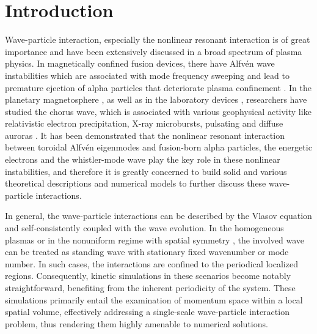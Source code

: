 \section{Introduction}
Wave-particle interaction, especially the nonlinear resonant interaction is of great importance and have been extensively discussed in a broad spectrum of plasma physics. 
In magnetically confined fusion devices, there have Alfv\'en wave instabilities \cite{chen2016,wang2018,} which are associated with mode frequency sweeping and lead to premature ejection of alpha particles that deteriorate plasma confinement \cite{fasoli2007}.
In the planetary magnetosphere \cite{tsurutani1974}, as well as in the laboratory devices \cite{vancompernolle2015,vancompernolle2017a}, researchers have studied the chorus wave, which is associated with various geophysical activity like relativistic electron precipitation, X-ray microbursts, pulsating and diffuse auroras \cite{kasahara2018,reeves2013,thorne2013}.
It has been demonstrated that the nonlinear resonant interaction between toroidal Alfv\'en eigenmodes and fusion-born alpha particles, the energetic electrons and the whistler-mode wave play the key role in these nonlinear instabilities, and therefore it is greatly concerned to build solid and various theoretical descriptions and numerical models to further discuss these wave-particle interactions.

In general, the wave-particle interactions can be described by the Vlasov equation and self-consistently coupled with the wave evolution. 
In the homogeneous plasmas \cite{lilley2009,breizman2010} or in the nonuniform regime with spatial symmetry \cite{hezaveh2017,hezaveh2020,hezaveh2021}, the involved wave can be treated as standing wave with stationary fixed wavenumber or mode number. 
In such cases, the interactions are confined to the periodical localized regions. Consequently, kinetic simulations in these scenarios become notably straightforward, benefiting from the inherent periodicity of the system. These simulations primarily entail the examination of momentum space within a local spatial volume, effectively addressing a single-scale wave-particle interaction problem, thus rendering them highly amenable to numerical solutions.


